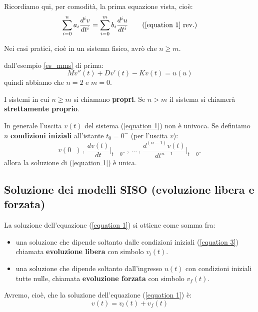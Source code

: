 	Ricordiamo qui, per comodità, la prima equazione vista, cioè:
	\begin{equation*}
		\sum\limits_{i=0}^n a_{i} \frac{ d^{i} v }{ dt^{i}  } = \sum\limits_{i=0}^m b_{i} \frac{ d^{i} u }{ dt^{i}  }
		\tag{\ref{equation 1} rev.}
	\end{equation*}

	\begin{osservazione}
		Nei casi pratici, cioè in un sistema fisico, avrò che $n \ge m$.
	\end{osservazione}

	\begin{nexample}
		dall'esempio \ref{es_mms} di prima:
		 \[ M v''(t) + D v'(t) - K v(t) = u(u) \]
		quindi abbiamo che $ n = 2 $ e $ m = 0 $.
	\end{nexample}

	
	\begin{definizione}
		I sistemi in cui $n \ge m$ si chiamano \textbf{propri}.
		Se $n > m$ il sistema si chiamerà \textbf{strettamente proprio}.
	\end{definizione}
	
	\begin{osservazione}
		In generale l'uscita $v(t)$ del sistema (\ref{equation 1}) non è univoca.
		Se definiamo $n$ \textbf{condizioni iniziali} all'istante $t_0 = 0^-$ (per l'uscita $v$):
		\begin{equation}
			v(0^-) \,
			,\, \frac{dv(t)}{dt}\bigg\vert_{t=0^-} \,
			,\, \dots\,
			,\, \frac{d^{(n-1)}v(t)}{dt^{n-1}}\bigg\vert_{t=0^-}
			\tag{3}\label{equation 3}
		\end{equation}
		allora la soluzione di (\ref{equation 1}) è unica.
	\end{osservazione}
	
\subsection{Soluzione dei modelli SISO (evoluzione libera e forzata)}
	
	La soluzione dell'equazione (\ref{equation 1}) si ottiene come somma fra:
	\begin{itemize}
		\item una soluzione che dipende soltanto dalle condizioni iniziali (\ref{equation 3}) chiamata \textbf{evoluzione libera} con simbolo $v_l(t)$.
		\item una soluzione che dipende soltanto dall'ingresso $u(t)$ con condizioni iniziali tutte nulle, chiamata \textbf{ evoluzione forzata} con simbolo $v_f(t)$.
	\end{itemize}
	Avremo, cioè, che la soluzione dell'equazione (\ref{equation 1}) è:\\
	\[
	v(t) = v_l(t) + v_f(t)
	\]
	

